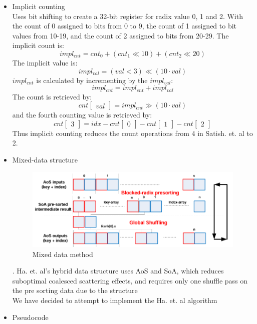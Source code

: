 \documentclass{article}
\begin{document}
\begin{itemize}
\item Implicit counting \\
Uses bit shifting to create a 32-bit register for radix value 0, 1 and 2. With the count of 0 assigned to bits from 0 to 9, the count of 1 assigned to bit values from 10-19, and the count of 2 assigned to bits from 20-29. The implicit count is: $$impl_{cnt} = cnt_0 + (cnt_1 \ll 10) + (cnt_2 \ll 20)$$
The implicit value is: 
$$impl_{val} = (val \lt  3) \ll (10 \cdot val)$$
$impl_{cnt}$ is calculated by incrementing by the $impl_{val}$:
$$impl_{cnt} = impl_{cnt} + impl_{val}$$
The count is retrieved by: 
$$cnt\begin{bmatrix}val\end{bmatrix} = impl_{cnt} \gg (10 \cdot val) $$
and the fourth counting value is retrieved by:
$$cnt\begin{bmatrix} 3 \end{bmatrix} = idx - cnt\begin{bmatrix} 0 \end{bmatrix} - cnt\begin{bmatrix} 1 \end{bmatrix} - cnt\begin{bmatrix} 2 \end{bmatrix}$$
Thus implicit counting reduces the count operations from 4 in Satish. et. al to 2. 
\item Mixed-data structure \\

\begin{figure} [H]
    \centering
    \includegraphics[width=\linewidth]{mixed-data.PNG}
    \caption{Mixed data method \citep{ha2010implicit}}
    \label{fig:enter-label}
\end{figure}.
Ha. et. al's hybrid data structure uses AoS and SoA, which reduces suboptimal coalesced scattering effects, and requires only one shuffle pass on the pre sorting data due to the structure \citep{ha2010implicit} 
\\
We have decided to attempt to implement the Ha. et. al algorithm
\item Pseudocode



\end{itemize}
\end{document}
